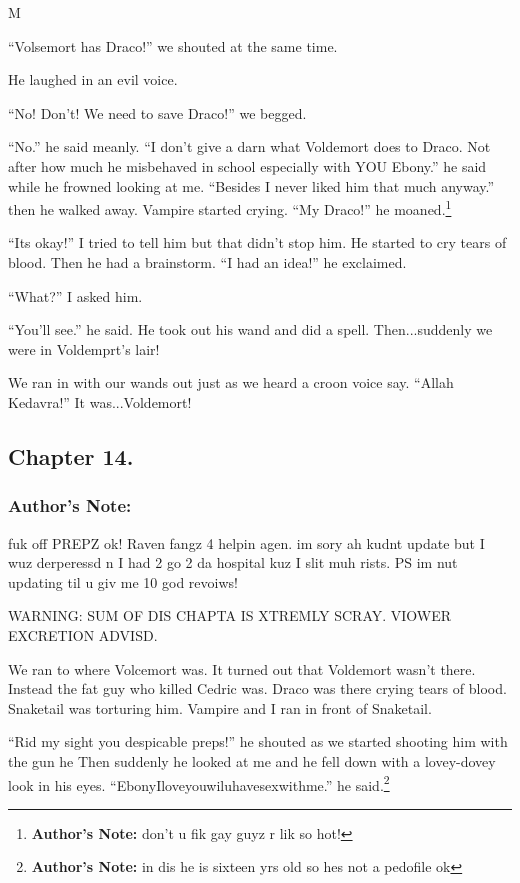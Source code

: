 M\documentclass{article}
\begin{document}
“Volsemort has Draco!” we shouted at the same time.

He laughed in an evil voice.

“No! Don’t! We need to save Draco!” we begged.

“No.” he said meanly. “I don’t give a darn what Voldemort does to Draco. Not after how much he misbehaved in school especially with YOU Ebony.” he said while he frowned looking at me. “Besides I never liked him that much anyway.” then he walked away. Vampire started crying. “My Draco!” he moaned.\footnote{\textbf{Author's Note: }don’t u fik gay guyz r lik so hot!}

“Its okay!” I tried to tell him but that didn’t stop him. He started to cry tears of blood. Then he had a brainstorm. “I had an idea!” he exclaimed.

“What?” I asked him.

“You’ll see.” he said. He took out his wand and did a spell. Then...suddenly we were in Voldemprt’s lair!

We ran in with our wands out just as we heard a croon voice say. “Allah Kedavra!”
It was...Voldemort!

\clearpage\nolinenumbers
\subsection*{Chapter 14.}

\subsubsection*{Author's Note: }fuk off PREPZ ok! Raven fangz 4 helpin agen. im sory ah kudnt update but I wuz derperessd n I had 2 go 2 da hospital kuz I slit muh rists. PS im nut updating til u giv me 10 god revoiws!

\textbreak
\linenumbers\resetlinenumber

WARNING: SUM OF DIS CHAPTA IS XTREMLY SCRAY. VIOWER EXCRETION ADVISD.

We ran to where Volcemort was. It turned out that Voldemort wasn’t there. Instead the fat guy who killed Cedric was. Draco was there crying tears of blood. Snaketail was torturing him. Vampire and I ran in front of Snaketail.

“Rid my sight you despicable preps!” he shouted as we started shooting him with the gun he Then suddenly he looked at me and he fell down with a lovey-dovey look in his eyes. “EbonyIloveyouwiluhavesexwithme.” he said.\footnote{\textbf{Author's Note: }in dis he is sixteen yrs old so hes not a pedofile ok}
\end{document}
